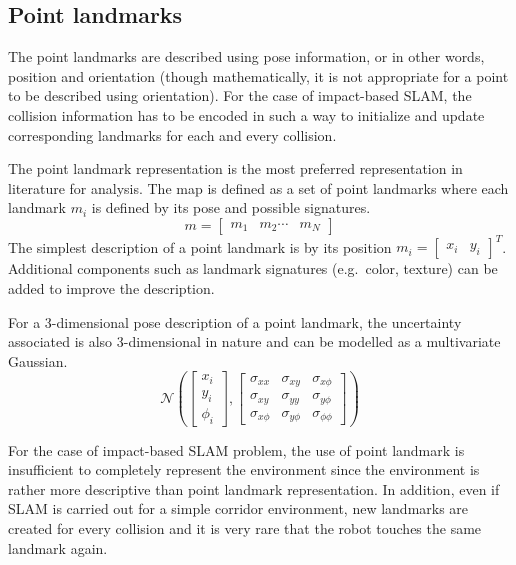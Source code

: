 \subsection{Point landmarks}
The point landmarks are described using pose information, or in other words, position and orientation (though mathematically, it is not appropriate for a point to be described using orientation). For the case of impact-based SLAM, the collision information has to be encoded in such a way to initialize and update corresponding landmarks for each and every collision. 

The point landmark representation is the most preferred representation in literature for analysis. The map is defined as a set of point landmarks where each landmark $m_i$ is defined by its pose and possible signatures. 
\begin{equation}
m = \begin{bmatrix}m_1 & m_2 \cdots & m_N\end{bmatrix}
\end{equation}
The simplest description of a point landmark is by its position $m_i=\begin{bmatrix}x_i & y_i\end{bmatrix}^T$. Additional components such as landmark signatures (e.g.\ color, texture) can be added to improve the description. 

For a 3-dimensional pose description of a point landmark, the uncertainty associated is also 3-dimensional in nature and can be modelled as a multivariate Gaussian.
\begin{equation}
\mathcal{N}\left(\begin{bmatrix}x_i \\ y_i \\ \phi_i \end{bmatrix},\begin{bmatrix}\sigma_{xx} & \sigma_{xy} & \sigma_{x\phi} \\ \sigma_{xy} & \sigma_{yy} & \sigma_{y\phi} \\ \sigma_{x\phi} & \sigma_{y\phi} & \sigma_{\phi\phi}\end{bmatrix}\right)
\end{equation}

For the case of impact-based SLAM problem, the use of point landmark is insufficient to completely represent the environment since the environment is rather more descriptive than point landmark representation. In addition, even if SLAM is carried out for a simple corridor environment, new landmarks are created for every collision and it is very rare that the robot touches the same landmark again. 

